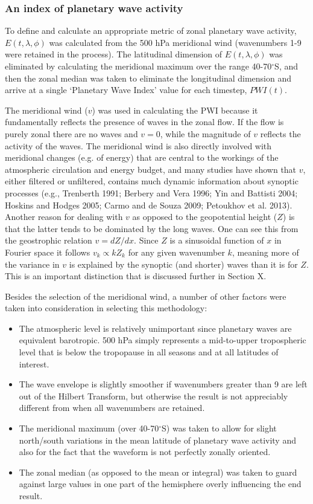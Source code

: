 \subsubsection{An index of planetary wave activity}

To define and calculate an appropriate metric of zonal planetary wave activity, $E(t,\lambda,\phi)$ was calculated from the 500 hPa meridional wind (wavenumbers 1-9 were retained in the process). The latitudinal dimension of $E(t,\lambda,\phi)$ was eliminated by calculating the meridional maximum over the range 40-70$^{\circ}$S, and then the zonal median was taken to eliminate the longitudinal dimension and arrive at a single `Planetary Wave Index' value for each timestep, $PWI(t)$. 

The meridional wind ($v$) was used in calculating the PWI because it fundamentally reflects the presence of waves in the zonal flow. If the flow is purely zonal there are no waves and $v = 0$, while the magnitude of $v$ reflects the activity of the waves. The meridional wind is also directly involved with meridional changes (e.g. of energy) that are central to the workings of the atmospheric circulation and energy budget, and many studies have shown that $v$, either filtered or unfiltered, contains much dynamic information about synoptic processes (e.g., Trenberth 1991; Berbery and Vera 1996; Yin and Battisti 2004; Hoskins and Hodges 2005; Carmo and de Souza 2009; Petoukhov et al. 2013). Another reason for dealing with $v$ as opposed to the geopotential height ($Z$) is that the latter tends to be dominated by the long waves. One can see this from the geostrophic relation $v = dZ / dx$. Since $Z$ is a sinusoidal function of $x$ in Fourier space it follows $v_k \propto k Z_k$ for any given wavenumber $k$, meaning more of the variance in $v$ is explained by the synoptic (and shorter) waves than it is for $Z$. This is an important distinction that is discussed further in Section X.

Besides the selection of the meridional wind, a number of other factors were taken into consideration in selecting this methodology:
\begin{itemize}
\item The atmospheric level is relatively unimportant since planetary waves are equivalent barotropic. 500 hPa simply represents a mid-to-upper tropospheric level that is below the tropopause in all seasons and at all latitudes of interest.
\item The wave envelope is slightly smoother if wavenumbers greater than 9 are left out of the Hilbert Transform, but otherwise the result is not appreciably different from when all wavenumbers are retained.
\item The meridional maximum (over 40-70$^{\circ}$S) was taken to allow for slight north/south variations in the mean latitude of planetary wave activity and also for the fact that the waveform is not perfectly zonally oriented. 
\item The zonal median (as opposed to the mean or integral) was taken to guard against large values in one part of the hemisphere overly influencing the end result.
\end{itemize}

